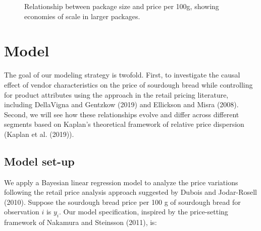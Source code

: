 \documentclass[
  letterpaper,
  DIV=11,
  numbers=noendperiod]{scrartcl}
\begin{document}
\begin{figure}


\caption{\label{fig-grams-vs-price}Relationship between package size and
price per 100g, showing economies of scale in larger packages.}

\end{figure}%

\section{Model}\label{model}

The goal of our modeling strategy is twofold. First, to investigate the
causal effect of vendor characteristics on the price of sourdough bread
while controlling for product attributes using the approach in the
retail pricing literature, including DellaVigna and Gentzkow (2019) and
Ellickson and Misra (2008). Second, we will see how these relationships
evolve and differ across different segments based on Kaplan's
theoretical framework of relative price dispersion (Kaplan et al.
(2019)).

\subsection{Model set-up}\label{model-set-up}

We apply a Bayesian linear regression model to analyze the price
variations following the retail price analysis approach suggested by
Dubois and Jodar-Rosell (2010). Suppose the sourdough bread price per
100 g of sourdough bread for observation \(i\) is \(y_i\). Our model
specification, inspired by the price-setting framework of Nakamura and
Steinsson (2011), is:
\end{document}
